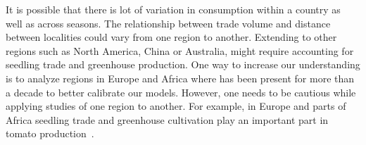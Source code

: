 

It is possible that there
is lot of variation in consumption within a country as well as across
seasons. The relationship between trade volume and distance between
localities could vary from one region to another. Extending to other
regions such as North America, China or Australia, might require accounting
for seedling trade and greenhouse production.
One way to increase our understanding
is to analyze regions in Europe and Africa where \tuta{} has been present
for more than a decade to better calibrate our models. However, one needs
to be cautious while applying studies of one region to another. For
example, in Europe and parts of Africa seedling trade and greenhouse
cultivation play an important part in tomato production~\cite{}. 


